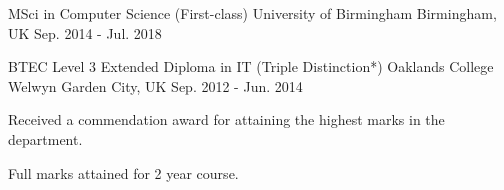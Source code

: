 

\begin{cventries}

  \cventry
  {MSci in Computer Science (First-class)} %
    {University of Birmingham} %
    {Birmingham, UK} %
    {Sep. 2014 - Jul. 2018} %
    {}

  \cventry
  {BTEC Level 3 Extended Diploma in IT (Triple Distinction*)} %
    {Oaklands College} %
    {Welwyn Garden City, UK} %
    {Sep. 2012 - Jun. 2014} %
    {
      \begin{cvitems} %
        \item {Received a commendation award for attaining the highest marks in the department.}
        \item {Full marks attained for 2 year course.}
      \end{cvitems}
    }

\end{cventries}
